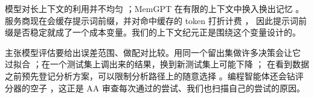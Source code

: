 模型对长上下文的利用并不均匀 \citep{liu2024lost}；MemGPT 在有限的上下文中换入换出记忆
\citep{packer2023memgpt}。服务商现在会缓存提示词前缀，并对命中缓存的 token 打折计费 \citep{openai2024caching}，
因此提示词前缀是否稳定就成了一个成本变量。我们的上下文纪元正是围绕这个变量设计的。

\citet{miller2024errorbars} 主张模型评估要给出误差范围、做配对比较。用同一个留出集做许多决策会让它
过拟合 \citep{dwork2015reusable}；在一个测试集上调出来的结果，换到新测试集上可能下降 \citep{recht2019imagenet}；
在看到数据之前预先登记分析方案，可以限制分析路径上的随意选择 \citep{nosek2018prereg}。编程智能体还会钻评分器的空子
\citep{metr2025rewardhacking}，这正是 AA 审查每次通过的尝试、我们也扫描自己的尝试的原因。
